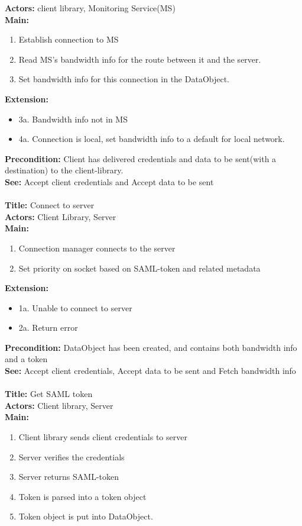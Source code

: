 		\textbf{Actors:} client library, Monitoring Service(MS) \\
		\textbf{Main:}
		\begin{enumerate}
			\item Establish connection to MS
			\item Read MS’s bandwidth info for the route between it and the server.
			\item Set bandwidth info for this connection in the DataObject.
		\end{enumerate}
		\textbf{Extension:}
		\begin{itemize}
			  \item[] 3a. Bandwidth info not in MS
			  \item[] 4a. Connection is local, set bandwidth info to a default for local network.
		\end{itemize}
		\textbf{Precondition:} Client has delivered credentials and data to be sent(with a destination) to the client-library. \\
		\textbf{See:} Accept client credentials and Accept data to be sent 
		\\\\
		\textbf{Title:} Connect to server \\
		\textbf{Actors:} Client Library, Server \\
		\textbf{Main:}
		\begin{enumerate}	
			\item Connection manager connects to the server
			\item Set priority on socket based on SAML-token and related metadata
		\end{enumerate}
		\textbf{Extension:}
		\begin{itemize}
			  \item[] 1a. Unable to connect to server
			  \item[] 2a. Return error
		\end{itemize}
		\textbf{Precondition:} DataObject has been created, and contains both bandwidth info and a token \\
		\textbf{See:} Accept client credentials, Accept data to be sent and Fetch bandwidth info
		\\\\
		\textbf{Title:} Get SAML token \\
		\textbf{Actors:} Client library, Server \\
		\textbf{Main:}
		\begin{enumerate}
			\item Client library sends client credentials to server
			\item Server verifies the credentials
			\item Server returns SAML-token
			\item Token is parsed into a token object
			\item Token object is put into DataObject.
		\end{enumerate}
